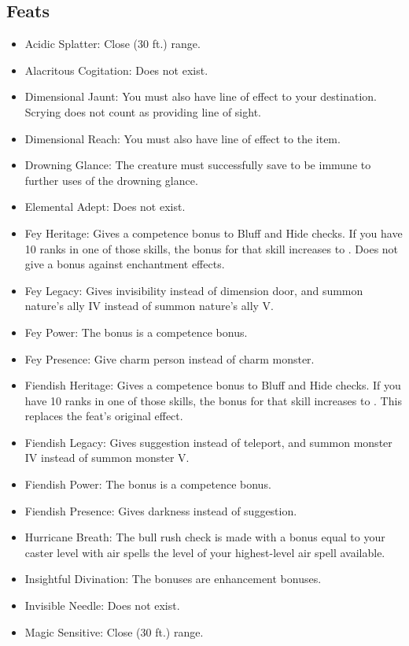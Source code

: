\subsection{Feats}
\begin{itemize}
\item Acidic Splatter: Close (30 ft.) range.
\item Alacritous Cogitation: Does not exist.
\item Dimensional Jaunt: You must also have line of effect to your destination. Scrying does not count as providing line of sight.
\item Dimensional Reach: You must also have line of effect to the item.
\item Drowning Glance: The creature must successfully save to be immune to further uses of the drowning glance.
\item Elemental Adept: Does not exist.
\item Fey Heritage: Gives a  competence bonus to Bluff and Hide checks. If you have 10 ranks in one of those skills, the bonus for that skill increases to . Does not give a bonus against enchantment effects.
\item Fey Legacy: Gives invisibility instead of dimension door, and summon nature's ally IV instead of summon nature's ally V.
\item Fey Power: The bonus is a competence bonus.
\item Fey Presence: Give charm person instead of charm monster.
\item Fiendish Heritage: Gives a  competence bonus to Bluff and Hide checks. If you have 10 ranks in one of those skills, the bonus for that skill increases to . This replaces the feat's original effect.
\item Fiendish Legacy: Gives suggestion instead of teleport, and summon monster IV instead of summon monster V.
\item Fiendish Power: The bonus is a competence bonus.
\item Fiendish Presence: Gives darkness instead of suggestion.
\item Hurricane Breath: The bull rush check is made with a bonus equal to your caster level with air spells \add the level of your highest-level air spell available.
\item Insightful Divination: The bonuses are enhancement bonuses.
\item Invisible Needle: Does not exist.
\item Magic Sensitive: Close (30 ft.) range.

\end{itemize}
